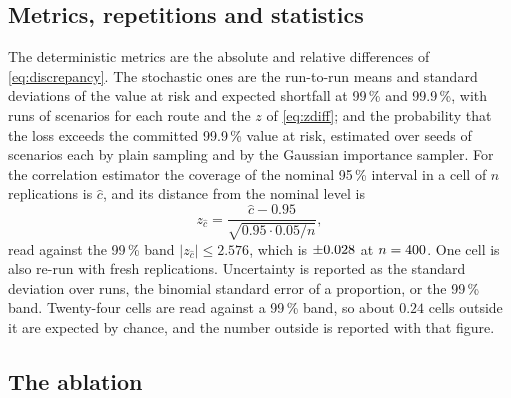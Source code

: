 \subsection{Metrics, repetitions and statistics}

The deterministic metrics are the absolute and relative differences of \eqref{eq:discrepancy}. The stochastic ones are the run-to-run means and standard deviations of the value at risk and expected shortfall at 99\,\% and 99.9\,\%, with \mcReps{} runs of \mcScen{} scenarios for each route and the $z$ of \eqref{eq:zdiff}; and the probability that the loss exceeds the committed 99.9\,\% value at risk, estimated over \isReps{} seeds of \isScen{} scenarios each by plain sampling and by the Gaussian importance sampler. For the correlation estimator the coverage of the nominal 95\,\% interval in a cell of $n$ replications is $\hat c$, and its distance from the nominal level is
\begin{equation}
  z_{\hat c}=\frac{\hat c-0.95}{\sqrt{0.95\cdot0.05/n}},
  \label{eq:zcover}
\end{equation}
read against the 99\,\% band $|z_{\hat c}|\le2.576$, which is $\pm0.028{}$ at $n=400{}$. One cell is also re-run with \cellReps{} fresh replications. Uncertainty is reported as the standard deviation over runs, the binomial standard error of a proportion, or the 99\,\% band. Twenty-four cells are read against a 99\,\% band, so about $0.24$ cells outside it are expected by chance, and the number outside is reported with that figure.

\subsection{The ablation}

